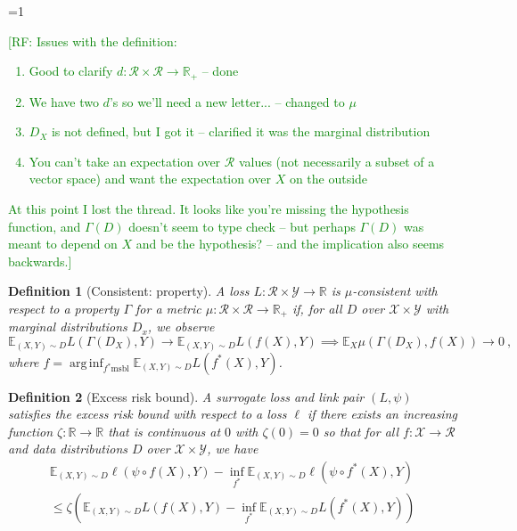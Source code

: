 \documentclass{article}
\newcommand{\Comments}{1}
\newcommand{\mynote}[2]{\ifnum\Comments=1\textcolor{#1}{#2}\fi}
\newcommand{\raf}[1]{\mynote{green}{[RF: #1]}}
\newcommand{\jessie}[1]{\mynote{purple}{[JF: #1]}}
\newcommand{\reals}{\mathbb{R}}
\newcommand{\simplex}{\Delta_\Y}
\newcommand{\E}{\mathbb{E}}
\newcommand{\R}{\mathcal{R}}
\newcommand{\X}{\mathcal{X}}
\newcommand{\Y}{\mathcal{Y}}
\newcommand{\toto}{\rightrightarrows}
\newtheorem{definition}{Definition}
\DeclareMathOperator*{\arginf}{arg\,inf}
\begin{document}

\raf{Issues with the definition:
\begin{enumerate}
\item Good to clarify $d:\R\times\R\to\reals_+$ -- done
\item We have two $d$'s so we'll need a new letter... -- changed to $\mu$
\item $D_X$ is not defined, but I got it -- clarified it was the marginal distribution
\item You can't take an expectation over $\R$ values (not necessarily a subset of a vector space) and want the expectation over $X$ on the outside
\end{enumerate}
At this point I lost the thread. It looks like you're missing the hypothesis function, and $\Gamma(D)$ doesn't seem to type check -- but perhaps $\Gamma(D)$ was meant to depend on $X$ and be the hypothesis? -- and the implication also seems backwards.}
\begin{definition}[Consistent: property]
	A loss $L : \R \times \Y \to \reals$ is \emph{$\mu$-consistent with respect to a property} $\Gamma$ for a metric $\mu:\R \times \R \to \reals_+$ if, for all $D$ over $\X \times \Y$ with marginal distributions $D_x$, we observe
	\begin{equation}
	\E_{(X,Y) \sim D} L( \Gamma(D_X), Y) \to \E_{(X,Y) \sim D} L(f(X), Y) \implies \E_X \mu(\Gamma(D_X), f(X)) \to 0~,~
	\end{equation}
	where $f = \arginf_{f^* \mathrm{msbl}} \E_{(X,Y) \sim D} L(f^*(X), Y)$.
\end{definition}

\begin{definition}[Excess risk bound]
	A surrogate loss and link pair $(L,\psi)$ satisfies the \emph{excess risk bound} with respect to a loss $\ell$ if there exists an increasing function $\zeta : \reals \to \reals$ that is continuous at $0$ with $\zeta(0) = 0$ so that for all $f:\X \to \R$ and data distributions $D$ over $\X \times \Y$, we have
	\begin{multline}
	\E_{(X,Y) \sim D} \ell(\psi \circ f(X), Y) - \inf_{f^*} \E_{(X,Y) \sim D} \ell(\psi \circ f^*(X), Y) \\ 
	\leq \zeta \left( \E_{(X,Y) \sim D} L(f(X), Y) - \inf_{f^*} \E_{(X,Y) \sim D} L(f^*(X), Y) \right)
	\end{multline}
\end{definition}
\end{document}
